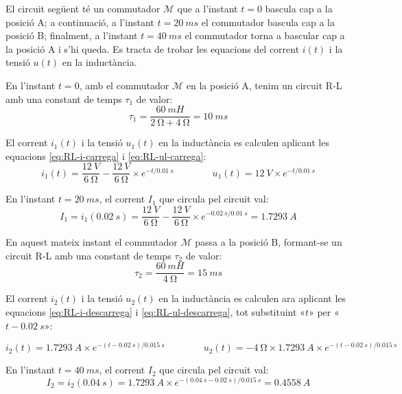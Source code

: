 \begin{exemple}\label{ex:CarDescRL}
	\addcontentsxms{\CarDescRL}	
    El circuit  següent té un commutador $\mathscr{M}$ que a l'instant $t=0$ bascula cap a la posició A; a continuació, a l'instant $t=\qty{20}{ms}$ el commutador bascula cap a la posició B; finalment, a  l'instant $t=\qty{40}{ms}$ el commutador torna a  bascular cap a la posició A i s'hi queda.     Es tracta de trobar les equacions del corrent $i(t)$ i la tensió $u(t)$ en la inductància.
    \vspace{-2mm}
   	\begin{center}
   	
   \end{center}
	 \vspace{-2mm}
    En l'instant $t=0$, amb el commutador $\mathscr{M}$ en la posició A, tenim un circuit R-L amb una constant de temps $\tau_1$ de valor:
    \[
        \tau_1 = \frac{\qty{60}{mH}}{\qty{2}{\ohm}+\qty{4}{\ohm}} = \qty{10}{ms}
    \]

    El corrent $i_1(t)$ i la tensió $u_1(t)$ en la inductància es calculen aplicant les equacions \eqref{eq:RL-i-carrega} i \eqref{eq:RL-ul-carrega}:
    \[
        i_1(t) = \frac{\qty{12}{V}}{\qty{6}{\ohm}} - \frac{\qty{12}{V}}{\qty{6}{\ohm}} \times e^{-t/\qty{0,01}{s}} \qquad\qquad
        u_1(t) = \qty{12}{V} \times e^{-t/\qty{0,01}{s}}
    \]

    En l'instant $t=\qty{20}{ms}$, el corrent $I_1$ que circula pel circuit val:
    \[
        I_1 = i_1(\qty{0,02}{s}) = \frac{\qty{12}{V}}{\qty{6}{\ohm}} - \frac{\qty{12}{V}}{\qty{6}{\ohm}} \times e^{-\qty{0,02}{s}/\qty{0,01}{s}} = \qty{1,7293}{A}
    \]

    En aquest mateix instant  el commutador $\mathscr{M}$ passa a la posició B, formant-se un circuit R-L amb una constant de temps $\tau_2$ de valor:
    \[
        \tau_2 = \frac{\qty{60}{mH}}{\qty{4}{\ohm}} = \qty{15}{ms}
    \]

    El corrent $i_2(t)$ i la tensió $u_2(t)$ en la inductància es calculen ara aplicant les equacions \eqref{eq:RL-i-descarrega} i \eqref{eq:RL-ul-descarrega}, tot  substituint «$t$» per «$t-\qty{0,02}{s}$»:
    
    \[
        i_2(t) = \qty{1,7293}{A} \times e^{-(t-\qty{0,02}{s})/\qty{0,015}{s}} \qquad\qquad u_2(t) = -\qty{4}{\ohm} \times \qty{1,7293}{A} \times e^{-(t-\qty{0,02}{s})/\qty{0,015}{s}}
    \]

    En l'instant $t=\qty{40}{ms}$, el corrent $I_2$ que circula pel circuit val:
    \[
        I_2 = i_2(\qty{0,04}{s}) = \qty{1,7293}{A} \times e^{-(\qty{0,04}{s} - \qty{0,02}{s})/\qty{0,015}{s}} = \qty{0,4558}{A}
    \]


\end{exemple}
